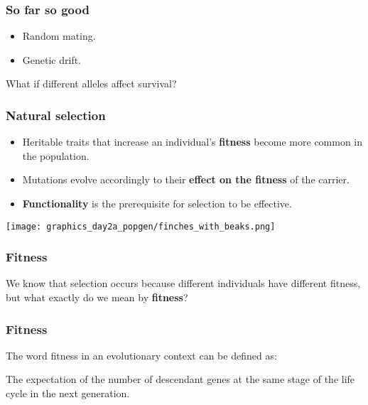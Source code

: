 \documentclass{beamer}
\newcommand{\1}{\ensuremath{\mathbf{1}}}
\begin{document}
%
%
%
\begin{frame}\frametitle{So far so good}
	\begin{itemize}
		\item Random mating.
		\item Genetic drift.
	\end{itemize}
	\vspace{2.5ex}What if different alleles affect survival?
\end{frame}
%
%
%
\begin{frame}\frametitle{Natural selection}
	\begin{itemize}
		\item Heritable traits that increase an individual's \textbf{fitness} become more common in the population.
		\item Mutations evolve accordingly to their \textbf{effect on the fitness} of the carrier.
		\item \textbf{Functionality} is the prerequisite for selection to be effective.
	\end{itemize}
	\phantom{pain}
	\begin{center}
		\texttt{[image: graphics\_day2a\_popgen/finches\_with\_beaks.png]}
	\end{center}
\end{frame}
%
%
%
\begin{frame}\frametitle{Fitness}
	We know that selection occurs because different individuals have different fitness, but what exactly do we mean by \textbf{fitness}?
\end{frame}
%
%
%
\begin{frame}\frametitle{Fitness}
	The word fitness in an evolutionary context can be defined as:
	\begin{block}{}
		The expectation of the number of descendant genes at the same stage of the life cycle in the next generation.
	\end{block}
\end{frame}
\end{document}
